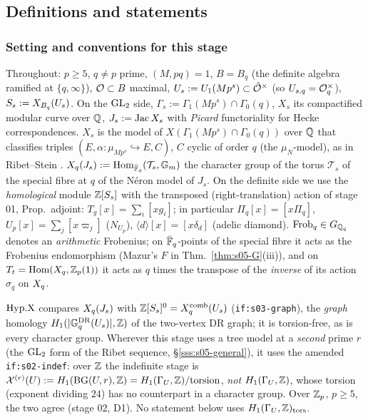 \subsection{Definitions and statements}

\subsubsection{Setting and conventions for this stage}
Throughout: $p\ge5$, $q\ne p$ prime, $(M,pq)=1$, $B=B_q$ (the definite algebra ramified at $\{q,\infty\}$), $\mathcal{O}\subset B$
maximal, $U_s:=U_1(Mp^s)\subset\hat{\mathcal{O}}^\times$ (so $U_{s,q}=\mathcal{O}_q^\times$), $S_s:=X_{B_q}(U_s)$. On the $\mathrm{GL}_2$ side,
$\Gamma_s:=\Gamma_1(Mp^s)\cap\Gamma_0(q)$, $X_s$ its compactified modular curve over $\mathbb{Q}$, $J_s:=\operatorname{Jac} X_s$ with
\emph{Picard} functoriality for Hecke correspondences. $X_s$ is the model of $X(\Gamma_1(Mp^s)\cap\Gamma_0(q))$ over $\mathbb{Q}$ that
classifies triples $(E,\alpha:\mu_{Mp^s}\hookrightarrow E,C)$, $C$ cyclic of order $q$ (the $\mu_N$-model), as in Ribet--Stein
. 
$X_q(J_s):=\operatorname{Hom}_{\bar{\mathbb{F}}_q}(\mathcal T_s,\mathbb G_m)$ the character
group of the torus $\mathcal T_s$ of the special fibre at $q$ of the Néron model of $J_s$. On the definite side we use the
\emph{homological} module $\mathbb{Z}[S_s]$ with the transposed (right-translation) action of stage 01,
Prop.~adjoint: $T_g[x]=\sum_i[xg_i]$; in particular $\Pi_q[x]=[x\Pi_q]$, $U_p[x]=\sum_j[x\varpi_j]$ ($N_{U_p}$),
$\langle d\rangle[x]=[x\delta_d]$ (adelic diamond). $\mathrm{Frob}_q\in G_{\mathbb{Q}_q}$ denotes an \emph{arithmetic} Frobenius; on
$\bar{\mathbb{F}}_q$-points of the special fibre it acts as the Frobenius endomorphism (Mazur's $F$ in Thm.~\ref{thm:s05-G}(iii)), and on
$T_t=\operatorname{Hom}(X_q,\mathbb{Z}_p(1))$ it acts as $q$ times the transpose of the \emph{inverse} of its action $\sigma_q$ on $X_q$.

\begin{remark}\label{rem:s05-D1}
$\mathrm{Hyp.X}$ compares $X_q(J_s)$ with $\mathbb{Z}[S_s]^0=X^{\mathrm{comb}}_q(U_s)$ (\texttt{if:s03-graph}), the \emph{graph} homology
$H_1(|\mathbb{G}^{\mathrm{DR}}_q(U_s)|,\mathbb{Z})$ of the two-vertex DR graph; it is torsion-free, as is every character group. Wherever this stage
uses a tree model at a \emph{second} prime $r$ (the $\mathrm{GL}_2$ form of the Ribet sequence, \S\ref{sss:s05-general}), it uses the
amended \texttt{if:s02-indef}: over $\mathbb{Z}$ the indefinite stage is $\mathcal{X}^{(r)}(U):=H_1(\mathrm{BG}(U,r),\mathbb{Z})=H_1(\Gamma_U,\mathbb{Z})/\text{torsion}$,
\emph{not} $H_1(\Gamma_U,\mathbb{Z})$, whose torsion (exponent dividing $24$) has no counterpart in a character group. Over $\mathbb{Z}_p$,
$p\ge5$, the two agree (stage 02, D1). No statement below uses $H_1(\Gamma_U,\mathbb{Z})_{\rm tors}$.
\end{remark}

